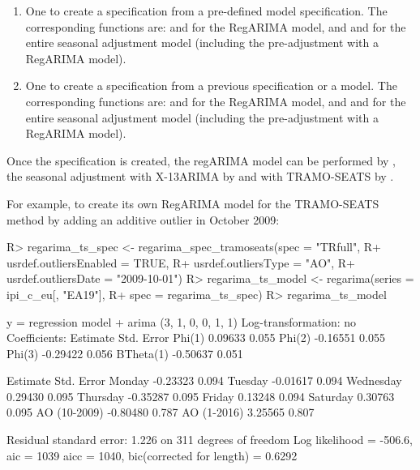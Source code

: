 \documentclass[article]{jss}
\begin{document}
\begin{enumerate}
\def\labelenumi{\arabic{enumi}.}
\item
  One to create a specification from a pre-defined 
  model specification. The corresponding functions are:
   and  for
  the RegARIMA model, and  and 
  for the entire seasonal adjustment model (including the pre-adjustment
  with a RegARIMA model).
\item
  One to create a specification from a previous specification or a
  model. The corresponding functions are:  and
   for the RegARIMA model, and
   and  for the entire seasonal
  adjustment model (including the pre-adjustment with a RegARIMA model).
\end{enumerate}

Once the specification is created, the regARIMA model can be performed
by , the seasonal adjustment with X-13ARIMA by
 and with TRAMO-SEATS by .

For example, to create its own RegARIMA model for the TRAMO-SEATS method
by adding an additive outlier in October 2009:

\begin{CodeChunk}

\begin{CodeInput}
R> regarima_ts_spec <- regarima_spec_tramoseats(spec = "TRfull",
R+              usrdef.outliersEnabled = TRUE,
R+              usrdef.outliersType = "AO",
R+              usrdef.outliersDate = "2009-10-01")
R> regarima_ts_model <- regarima(series = ipi_c_eu[, "EA19"],
R+                               spec = regarima_ts_spec)
R> regarima_ts_model
\end{CodeInput}

\begin{CodeOutput}
y = regression model + arima (3, 1, 0, 0, 1, 1)
Log-transformation: no
Coefficients:
          Estimate Std. Error
Phi(1)     0.09633      0.055
Phi(2)    -0.16551      0.055
Phi(3)    -0.29422      0.056
BTheta(1) -0.50637      0.051

             Estimate Std. Error
Monday       -0.23323      0.094
Tuesday      -0.01617      0.094
Wednesday     0.29430      0.095
Thursday     -0.35287      0.095
Friday        0.13248      0.094
Saturday      0.30763      0.095
AO (10-2009) -0.80480      0.787
AO (1-2016)   3.25565      0.807


Residual standard error: 1.226 on 311 degrees of freedom
Log likelihood = -506.6, aic =  1039 aicc =  1040, bic(corrected for length) = 0.6292
\end{CodeOutput}
\end{CodeChunk}
\end{document}
